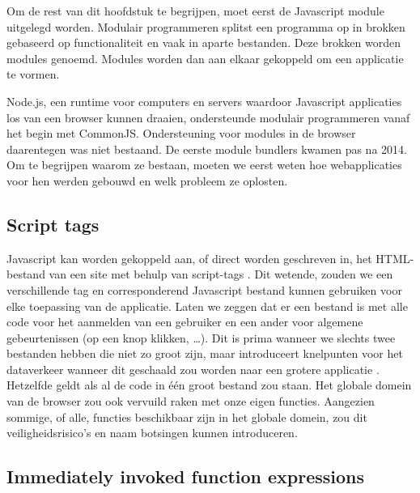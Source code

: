 Om de rest van dit hoofdstuk te begrijpen, moet eerst de \gls{Javascript} module uitgelegd worden. Modulair programmeren splitst een programma op in brokken gebaseerd op functionaliteit en vaak in aparte bestanden. Deze brokken worden modules genoemd. Modules worden dan aan elkaar gekoppeld om een applicatie te vormen. \autocite{webpack-no-dateB} \autocite{mozilla-2021A}

Node.js, een runtime voor computers en servers waardoor \gls{Javascript} applicaties los van een browser kunnen draaien, ondersteunde modulair programmeren vanaf het begin met CommonJS. Ondersteuning voor modules in de browser daarentegen was niet bestaand. De eerste module bundlers kwamen pas na 2014. Om te begrijpen waarom ze bestaan, moeten we eerst weten hoe webapplicaties voor hen werden gebouwd en welk probleem ze oplosten. \autocite{webpack-no-dateA}

\subsection{Script tags}

\gls{Javascript} kan worden gekoppeld aan, of direct worden geschreven in, het \gls{HTML}-bestand van een site met behulp van script-tags \autocite{mozilla-2021}. Dit wetende, zouden we een verschillende tag en corresponderend \gls{Javascript} bestand kunnen gebruiken voor elke toepassing van de applicatie. Laten we zeggen dat er een bestand is met alle code voor het aanmelden van een gebruiker en een ander voor algemene gebeurtenissen (op een knop klikken, \ldots). Dit is prima wanneer we slechts twee bestanden hebben die niet zo groot zijn, maar introduceert knelpunten voor het dataverkeer wanneer dit geschaald zou worden naar een grotere applicatie \autocite{webpack-no-dateB}. Hetzelfde geldt als al de code in één groot bestand zou staan. Het globale domein van de browser zou ook vervuild raken met onze eigen functies. Aangezien sommige, of alle, functies beschikbaar zijn in het globale domein, zou dit veiligheidsrisico's en naam botsingen kunnen introduceren. 



\subsection{Immediately invoked function expressions}

